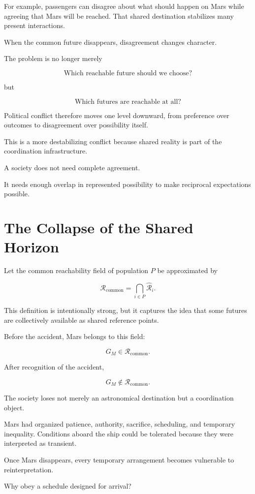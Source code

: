 \documentclass[11pt,oneside]{book}
\theoremstyle{definition}
\theoremstyle{remark}
\newcommand{\R}{\mathcal{R}}
\begin{document}
For example, passengers can disagree about what should happen on Mars while agreeing that Mars will be reached. That shared destination stabilizes many present interactions.

When the common future disappears, disagreement changes character.

The problem is no longer merely

\[
\text{Which reachable future should we choose?}
\]

but

\[
\text{Which futures are reachable at all?}
\]

Political conflict therefore moves one level downward, from preference over outcomes to disagreement over possibility itself.

This is a more destabilizing conflict because shared reality is part of the coordination infrastructure.

A society does not need complete agreement.

It needs enough overlap in represented possibility to make reciprocal expectations possible.

\section{The Collapse of the Shared Horizon}

Let the common reachability field of population \(P\) be approximated by

\[
\R_{\mathrm{common}}
=
\bigcap_{i\in P}
\widehat{\R}_i.
\]

This definition is intentionally strong, but it captures the idea that some futures are collectively available as shared reference points.

Before the accident, Mars belongs to this field:

\[
G_M\in\R_{\mathrm{common}}.
\]

After recognition of the accident,

\[
G_M\notin\R_{\mathrm{common}}.
\]

The society loses not merely an astronomical destination but a coordination object.

Mars had organized patience, authority, sacrifice, scheduling, and temporary inequality. Conditions aboard the ship could be tolerated because they were interpreted as transient.

Once Mars disappears, every temporary arrangement becomes vulnerable to reinterpretation.

Why obey a schedule designed for arrival?
\end{document}
